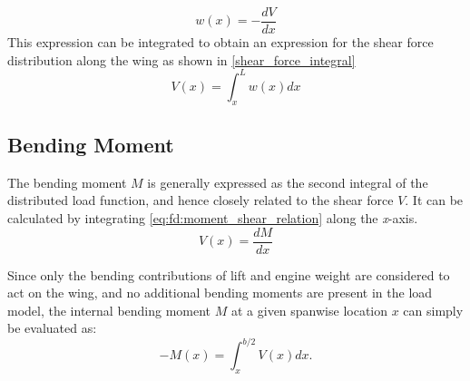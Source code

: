 \begin{equation} \label{eq:shear_force_relation}
    w(x) = -\frac{dV}{dx}
\end{equation}
\noindent This expression can be integrated to obtain an expression for the shear force distribution along the wing as shown in \autoref{shear_force_integral}
\begin{equation} \label{shear_force_integral}
    V(x) = \int^L_x{w(x)dx}
\end{equation}

\subsection*{Bending Moment}
The bending moment $M$ is generally expressed as the second integral of the distributed load function, and hence closely related to the shear force $V$. It can be calculated by integrating \autoref{eq:fd:moment_shear_relation} \cite{Timmer2024AE2111-IReader} along the \textit{x}-axis.
\begin{equation}    \label{eq:fd:moment_shear_relation}
    V(x)=\frac{dM}{dx}
\end{equation}

\noindent Since only the bending contributions of lift and engine weight are considered to act on the wing, and no additional bending moments are present in the load model, the internal bending moment $M$ at a given spanwise location $x$ can simply be evaluated as:
\begin{equation*}
    -M(x)=\int^{b/2}_x V(x)dx.
\end{equation*}




